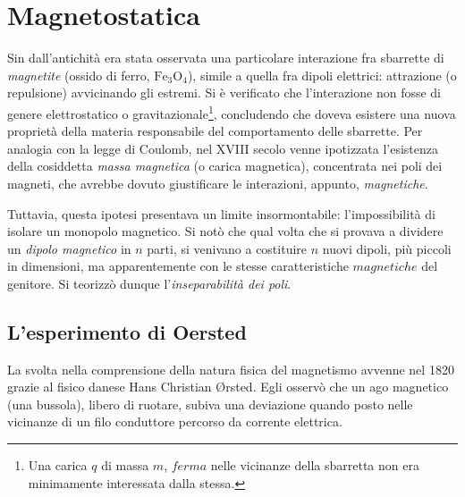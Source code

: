 \documentclass[a4paper,11pt]{report}
\begin{document}
\chapter{Magnetostatica}

Sin dall'antichità era stata osservata una particolare interazione fra sbarrette di \textit{magnetite} (ossido di ferro, $\text{Fe}_3\text{O}_4$), simile a quella fra dipoli elettrici: attrazione (o repulsione) avvicinando gli estremi. 
Si è verificato che l'interazione non fosse di genere elettrostatico o gravitazionale\footnote{Una carica $q$ di massa $m$, $ferma$ nelle vicinanze della sbarretta non era minimamente interessata dalla stessa.}, concludendo che doveva esistere una nuova proprietà della materia responsabile del comportamento delle sbarrette. 
Per analogia con la legge di Coulomb, nel XVIII secolo venne ipotizzata l'esistenza della cosiddetta \textit{massa magnetica} (o carica magnetica), concentrata nei poli dei magneti, che avrebbe dovuto giustificare le interazioni, appunto, \textit{magnetiche}.

Tuttavia, questa ipotesi presentava un limite insormontabile: l'impossibilità di isolare un monopolo magnetico. Si notò che qual volta che si provava a dividere un \textit{dipolo magnetico} in $n$ parti, si venivano a costituire $n$ nuovi dipoli, più piccoli in dimensioni, ma apparentemente con le stesse caratteristiche $magnetiche$ del genitore. Si teorizzò dunque l'\textit{inseparabilità dei poli}.

\section{L'esperimento di Oersted}
La svolta nella comprensione della natura fisica del magnetismo avvenne nel 1820 grazie al fisico danese Hans Christian Ørsted. 
Egli osservò che un ago magnetico (una bussola), libero di ruotare, subiva una deviazione quando posto nelle vicinanze di un filo conduttore percorso da corrente elettrica.
\end{document}
